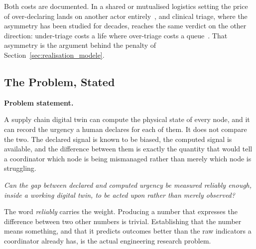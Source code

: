 Both costs are documented. In a shared or mutualised logistics setting the price of
over-declaring lands on another actor
entirely~\autocite{montreuil2011toward,li2020exploring}, and clinical triage, where the
asymmetry has been studied for decades, reaches the same verdict on the other direction:
under-triage costs a life where over-triage costs a
queue~\autocite{kim2020admission,mackway2013emergency}. That asymmetry is the argument behind
the penalty of Section~\ref{sec:realisation_modele}.

\subsection{The Problem, Stated}
\label{sec:question}

\begin{definitionBox}
\noindent\textbf{Problem statement.}

\medskip

A supply chain digital twin can compute the physical state of every node, and it can record
the urgency a human declares for each of them. It does not compare the two. The declared
signal is known to be biased, the computed signal is available, and the difference between
them is exactly the quantity that would tell a coordinator which node is being mismanaged
rather than merely which node is struggling.

\medskip

\noindent\emph{Can the gap between declared and computed urgency be measured reliably
enough, inside a working digital twin, to be acted upon rather than merely observed?}
\end{definitionBox}

The word \emph{reliably} carries the weight. Producing a number that expresses the difference
between two other numbers is trivial. Establishing that the number means something, and that it
predicts outcomes better than the raw indicators a coordinator already has, is the actual
engineering research problem.
